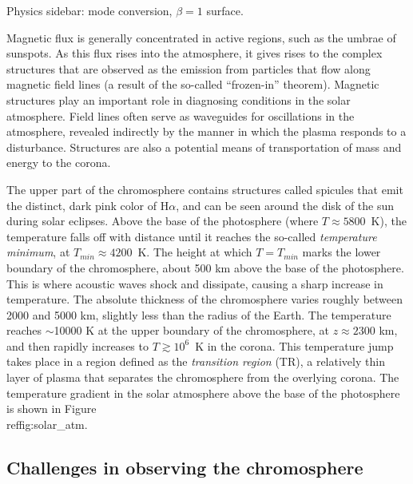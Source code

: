 \begin{framed}
    Physics sidebar: mode conversion, $\beta = 1$ surface.
\end{framed}

Magnetic flux is generally concentrated in active regions, such as the umbrae
of sunspots. As this flux rises into the atmosphere, it gives rises to the
complex structures that are observed as the emission from particles that flow
along magnetic field lines (a result of the so-called ``frozen-in'' theorem).
Magnetic structures play an important role in diagnosing conditions in the
solar atmosphere. Field lines often serve as waveguides for oscillations in the
atmosphere, revealed indirectly by the manner in which the plasma responds to a
disturbance. Structures are also a potential means of transportation of mass
and energy to the corona.


The upper part of
the chromosphere contains structures called spicules that emit the distinct,
dark pink color of H$\alpha$, and can be seen around the disk of the sun during
solar eclipses. Above the base of the photosphere (where $T \approx 5800$~K),
the temperature falls off with distance until it reaches the so-called
\textit{temperature minimum}, at $T_{min} \approx 4200$~K. The height at which
$T = T_{min}$ marks the lower boundary of the chromosphere, about 500 km above
the base of the photosphere. This is where acoustic waves shock and dissipate,
causing a sharp increase in temperature. The absolute thickness of the
chromosphere varies roughly between 2000 and 5000 km, slightly less than the
radius of the Earth. The temperature reaches $\sim$10000 K at the upper
boundary of the chromosphere, at $z \approx 2300$ km, and then rapidly
increases to $T\!\gtrsim\!10^{6}$~K in the corona.
This temperature jump takes
place in a region defined as the \textit{transition region} (TR), a relatively
thin layer of plasma that separates the chromosphere from the overlying corona.
The temperature gradient in the solar atmosphere above the base of the
photosphere is shown in
Figure~\\ref{fig:solar\_atm}.



\subsection{Challenges in observing the chromosphere}





\clearpage
